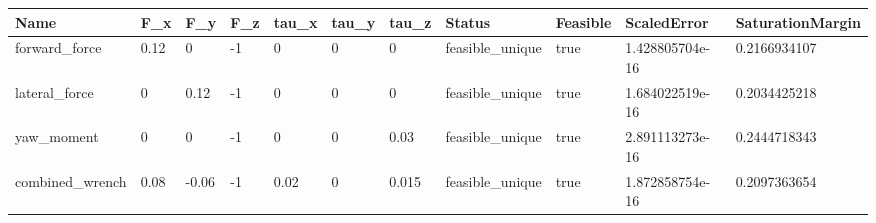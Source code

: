 \begin{tabular}{@{}lllllllllll@{}}
\toprule
Name & F\_x & F\_y & F\_z & tau\_x & tau\_y & tau\_z & Status & Feasible & ScaledError & SaturationMargin \\
\midrule
forward\_force & 0.12 & 0 & -1 & 0 & 0 & 0 & feasible\_unique & true & 1.428805704e-16 & 0.2166934107 \\
lateral\_force & 0 & 0.12 & -1 & 0 & 0 & 0 & feasible\_unique & true & 1.684022519e-16 & 0.2034425218 \\
yaw\_moment & 0 & 0 & -1 & 0 & 0 & 0.03 & feasible\_unique & true & 2.891113273e-16 & 0.2444718343 \\
combined\_wrench & 0.08 & -0.06 & -1 & 0.02 & 0 & 0.015 & feasible\_unique & true & 1.872858754e-16 & 0.2097363654 \\
\bottomrule
\end{tabular}
